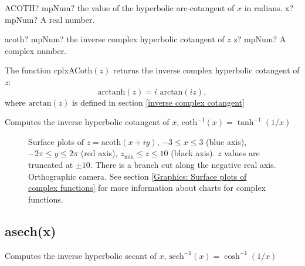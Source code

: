 \begin{mpFunctionsExtract}
	\mpWorksheetFunctionOneNotImplemented
	{ACOTH? mpNum? the value of the hyperbolic arc-cotangent  of $x$ in radians.}
	{x? mpNum? A real number.}
\end{mpFunctionsExtract}

\vspace{0.6cm}



\begin{mpFunctionsExtract}
	\mpFunctionOne
	{acoth? mpNum? the inverse complex hyperbolic cotangent of $z$}
	{z? mpNum? A complex number.}
\end{mpFunctionsExtract}

\vspace{0.3cm}
The function \textsf{cplxACoth$(z)$} returns the inverse complex hyperbolic cotangent of $z$: 
\begin{equation}
	\text{arctanh}(z) = i \text{ arctan}(iz),
\end{equation}
where $\text{arctan}(z)$ is defined in section \ref{inverse complex cotangent}



Computes the inverse hyperbolic cotangent of $x$, $\text{coth}^{-1}(x) = \tanh^{-1}(1/x)$

\begin{figure}[ht]%
	\centering
	\qquad
	\caption[Complex Inverse Hyperbolic Cotangent]{Surface plots of $z = \text{acoth}(x + iy)$, $-3 \leq x \leq 3$ (blue axis), $-2 \pi \leq y \leq 2\pi$ (red axis), $z_{\text{min}} \leq z \leq 10$ (black axis). $z$ values are truncated at $\pm 10$. There is a branch cut along the negative real axis. Orthographic camera. See section \ref{Graphics: Surface plots of complex functions} for more information about charts for complex functions.} 
	\label{fig:Complex Inverse Hyperbolic Cotangent}%
\end{figure}



\subsection{asech(x)}
Computes the inverse hyperbolic secant of $x$, $\text{sech}^{-1}(x) = \cosh^{-1}(1/x)$



